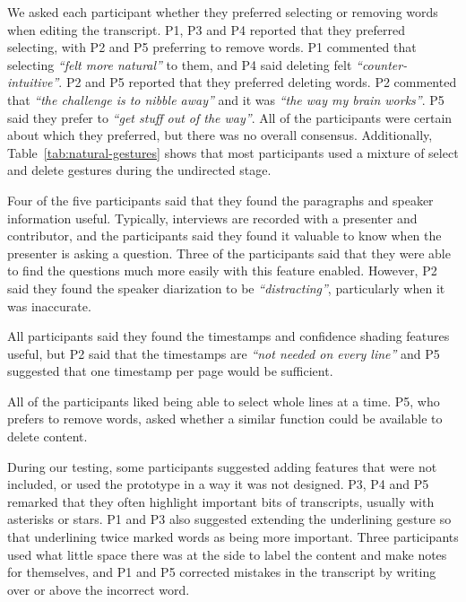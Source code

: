 We asked each participant whether they preferred selecting or removing words when editing the transcript.  P1, P3 and
P4 reported that they preferred selecting, with P2 and P5 preferring to remove words.  P1 commented that selecting
\textit{``felt more natural''} to them, and P4 said deleting felt \textit{``counter-intuitive''}.  P2 and P5
reported that they preferred deleting words. P2 commented that \textit{``the challenge is to nibble away''} and it was
\textit{``the way my brain works''}.  P5 said they prefer to \textit{``get stuff out of the way''}.  All of the
participants were certain about which they preferred, but there was no overall consensus. Additionally,
Table~\ref{tab:natural-gestures} shows that most participants used a mixture of select and delete gestures during the
undirected stage.

Four of the five participants said that they found the paragraphs and speaker information useful. Typically, interviews
are recorded with a presenter and contributor, and the participants said they found it valuable to know when the
presenter is asking a question. Three of the participants said that they were able to find the questions much more
easily with this feature enabled. However, P2 said they found the speaker diarization to be \textit{``distracting''},
particularly when it was inaccurate.

All participants said they found the timestamps and confidence shading features useful, but P2 said that the timestamps
are \textit{``not needed on every line''} and P5 suggested that one timestamp per page would be sufficient.

All of the participants liked being able to select whole lines at a time. P5, who prefers to remove words, asked
whether a similar function could be available to delete content.

During our testing, some participants suggested adding features that were not included, or used the prototype in a way
it was not designed.  P3, P4 and P5 remarked that they often highlight important bits of transcripts, usually with
asterisks or stars.  P1 and P3 also suggested extending the underlining gesture so that underlining twice marked words as
being more important.  Three participants used what little space there was at the side to label the content and make
notes for themselves, and P1 and P5 corrected mistakes in the transcript by writing over or above the incorrect word.


